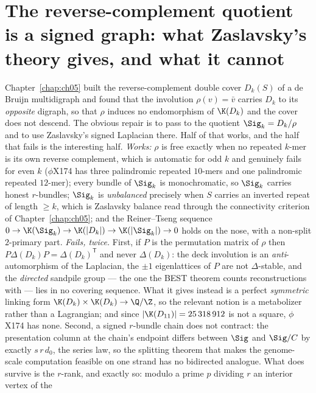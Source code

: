 \chapter[The quotient is a signed graph]{The reverse-complement quotient is a signed graph: what Zaslavsky's theory gives, and what it cannot}\label{chap:ch06}
\begin{chaptersummary}
Chapter~\ref{chap:ch05} built the reverse-complement double cover $D_k(S)$ of a de Bruijn
multidigraph and found that the involution $\rho(v)=\bar v$ carries $D_k$ to its
\emph{opposite} digraph, so that $\rho$ induces no endomorphism of $\K(D_k)$ and the cover
does not descend. The obvious repair is to pass to the quotient $\Sig_k=D_k/\rho$ and to use
Zaslavsky's signed Laplacian there. Half of that works, and the half that fails is the
interesting half. \emph{Works:} $\rho$ is free exactly when no repeated $k$-mer is its own
reverse complement, which is automatic for odd $k$ and genuinely fails for even $k$
($\phi$X174 has three palindromic repeated $10$-mers and one palindromic repeated $12$-mer);
every bundle of $\Sig_k$ is monochromatic, so $\Sig_k$ carries honest $r$-bundles; $\Sig_k$
is \emph{unbalanced} precisely when $S$ carries an inverted repeat of length $\ge k$, which
is Zaslavsky balance read through the connectivity criterion of Chapter~\ref{chap:ch05}; and the
Reiner--Tseng sequence
$0\to\K(\Sig_k)\to\K(|D_k|)\to\K(|\Sig_k|)\to 0$
holds on the nose, with a non-split $2$-primary part.
\emph{Fails, twice.} First, if $P$ is the permutation matrix of $\rho$ then
$P\Delta(D_k)P=\Delta(D_k)^{\mathsf T}$ and never $\Delta(D_k)$: the deck involution is an
\emph{anti}-automorphism of the Laplacian, the $\pm1$ eigenlattices of $P$ are not
$\Delta$-stable, and the \emph{directed} sandpile group --- the one the BEST theorem counts
reconstructions with --- lies in no covering sequence. What it gives instead is a perfect
\emph{symmetric} linking form $\K(D_k)\times\K(D_k)\to\Q/\Z$, so the relevant notion is a
metabolizer rather than a Lagrangian; and since $|\K(D_{11})|=25\,318\,912$ is not a square,
$\phi$X174 has none. Second, a signed $r$-bundle chain does
not contract: the presentation column at the chain's endpoint differs between $\Sig$ and
$\Sig/C$ by exactly $s\,r\,d_0$, the series law, so the splitting theorem that makes the
genome-scale computation feasible on one strand has no bidirected analogue. What does survive
is the $r$-rank, and exactly so: modulo a prime $p$ dividing $r$ an interior vertex of the

\end{chaptersummary}
